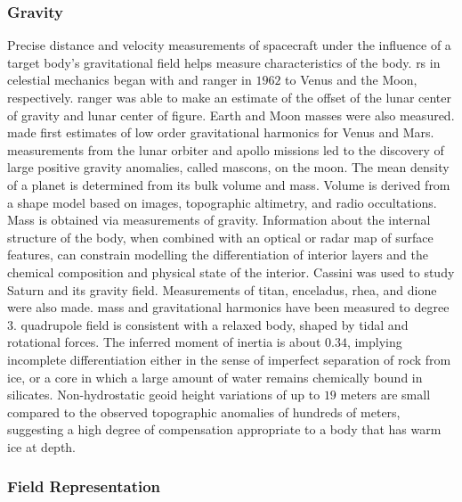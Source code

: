 \documentclass{article}
\theoremstyle{mystyle}
\begin{document}
\subsubsection{Gravity}
%
\noindent Precise distance and velocity measurements of spacecraft under the influence of a target body's \gls{gravitational field} helps measure characteristics of the body. \gls{rs} in celestial mechanics began with  and \gls{ranger} in $1962$ to Venus and the Moon, respectively. \gls{ranger} was able to make an estimate of the offset of the lunar \gls{center of gravity} and lunar \gls{center of figure}. Earth and Moon masses were also measured.  made first estimates of low order gravitational harmonics for Venus and Mars.  measurements from the \gls{lunar orbiter} and \gls{apollo} missions led to the discovery of large positive gravity anomalies, called \glspl{mascon}, on the moon. The mean density of a planet is determined from its bulk volume and mass. Volume is derived from a shape model based on images, topographic \gls{altimetry}, and radio \glspl{occultation}. Mass is obtained via measurements of gravity. Information about the internal structure of the body, when combined with an optical or radar map of surface features,
can constrain modelling the differentiation of interior layers and the chemical composition and physical state of the interior. Cassini was used to study Saturn and its gravity field. Measurements of \gls{titan}, \gls{enceladus}, \gls{rhea}, and \gls{dione} were also made.  mass and \gls{gravitational harmonics} have been measured to degree $3$.  \gls{quadrupole} field is consistent with a  relaxed body, shaped by tidal and rotational forces. The inferred \gls{moment of inertia} is about $0.34$, implying incomplete differentiation either in the sense of imperfect separation of rock from ice, or a core in which a large amount of water remains chemically bound in silicates. Non-hydrostatic \gls{geoid}
height variations of up to $19$ meters are small compared to the observed topographic anomalies of hundreds of meters, suggesting a high degree of compensation appropriate to a body that has warm ice at depth.

\subsubsection{\footnotesize Field Representation}
\end{document}
